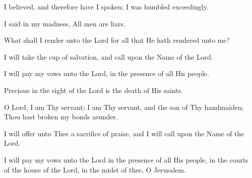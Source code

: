 I believed, and therefore have I spoken; I was humbled exceedingly.

I said in my madness, All men are liars.

What shall I render unto the Lord for all that He hath rendered unto me?

I will take the cup of salvation, and call upon the Name of the Lord.

I will pay my vows unto the Lord, in the presence of all His people.

Precious in the sight of the Lord is the death of His saints.

O Lord, I am Thy servant; I am Thy servant, and the son of Thy handmaiden; Thou hast broken my bonds asunder.

I will offer unto Thee a sacrifice of praise, and I will call upon the Name of the Lord.

I will pay my vows unto the Lord in the presence of all His people, in the courts of the house of the Lord, in the midst of thee, O Jerusalem.
